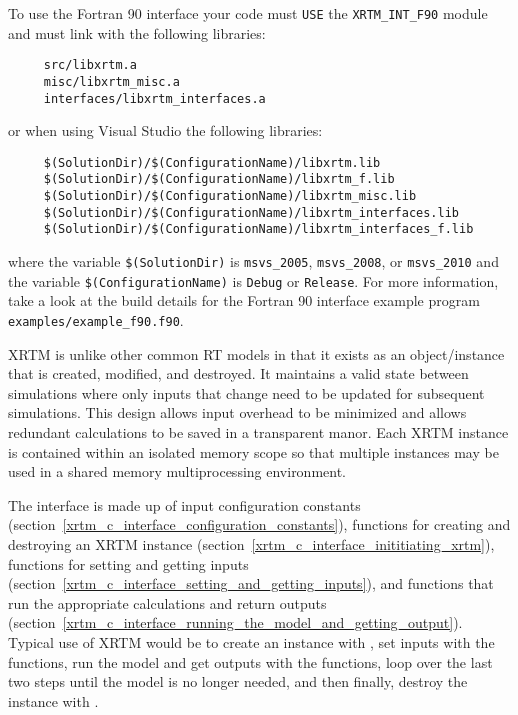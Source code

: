 \label{building_and_using_xrtm_using_xrtm_in_your_code_fortran_90}

To use the Fortran 90 interface your code must \texttt{USE} the \texttt{XRTM\_INT\_F90} module
and must link with the following libraries:
\begin{verbatim}
     src/libxrtm.a
     misc/libxrtm_misc.a
     interfaces/libxrtm_interfaces.a
\end{verbatim}
or when using Visual Studio the following libraries:
\begin{verbatim}
     $(SolutionDir)/$(ConfigurationName)/libxrtm.lib
     $(SolutionDir)/$(ConfigurationName)/libxrtm_f.lib
     $(SolutionDir)/$(ConfigurationName)/libxrtm_misc.lib
     $(SolutionDir)/$(ConfigurationName)/libxrtm_interfaces.lib
     $(SolutionDir)/$(ConfigurationName)/libxrtm_interfaces_f.lib
\end{verbatim}
where the variable \texttt{\$(SolutionDir)} is \texttt{msvs\_2005}, \texttt{msvs\_2008}, or \texttt{msvs\_2010} and the variable \texttt{\$(ConfigurationName)} is \texttt{Debug} or \texttt{Release}.  For more information, take a look at the build details for the Fortran 90 interface example program \texttt{examples/example\_f90.f90}.



%
\label{xrtm_c_interface}

XRTM is unlike other common RT models in that it exists as an object/instance that is created, modified, and destroyed.  It maintains a valid state between simulations where only inputs that change need to be updated for subsequent simulations.  This design allows input overhead to be minimized and allows redundant calculations to be saved in a transparent manor.  Each XRTM instance is contained within an isolated memory scope so that multiple instances may be used in a shared memory multiprocessing environment.

The interface is made up of input configuration constants (section~\ref{xrtm_c_interface_configuration_constants}), functions for creating and destroying an XRTM instance (section~\ref{xrtm_c_interface_inititiating_xrtm}), functions for setting and getting inputs (section~\ref{xrtm_c_interface_setting_and_getting_inputs}), and functions that run the appropriate calculations and return outputs (section~\ref{xrtm_c_interface_running_the_model_and_getting_output}).  Typical use of XRTM would be to create an instance with , set inputs with the  functions, run the model and get outputs with the  functions, loop over the last two steps until the model is no longer needed, and then finally, destroy the instance with .


